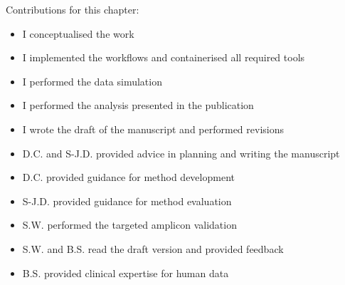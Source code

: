 {Contributions for this chapter:
\begin{itemize}
	\item I conceptualised the work
	\item I implemented the workflows and containerised all required tools
	\item I performed the data simulation
	\item I performed the analysis presented in the publication
	\item I wrote the draft of the manuscript and performed revisions
	\item D.C. and S-J.D. provided advice in planning and writing the manuscript
	\item D.C. provided guidance for method development
	\item S-J.D. provided guidance for method evaluation
	\item S.W. performed the targeted amplicon validation
	\item S.W. and  B.S. read the draft version and provided feedback
	\item B.S. provided clinical expertise for human data
\end{itemize}

}
